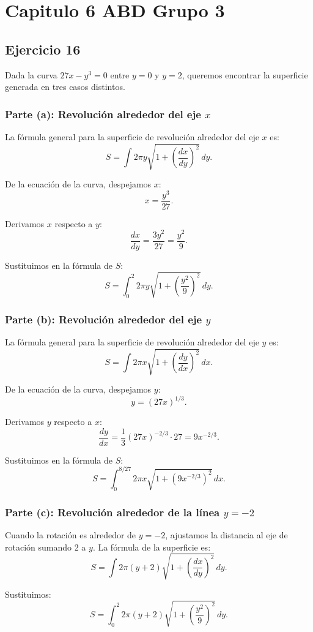 \chapter*{Capitulo 6 ABD Grupo 3}
\section*{Ejercicio 16}

Dada la curva \( 27x - y^3 = 0 \) entre \( y = 0 \) y \( y = 2 \), queremos encontrar la superficie generada en tres casos distintos.

\subsection*{Parte (a): Revolución alrededor del eje \( x \)}

La fórmula general para la superficie de revolución alrededor del eje \( x \) es:
\[
S = \int 2\pi y \sqrt{1 + \left( \frac{dx}{dy} \right)^2} \, dy.
\]

De la ecuación de la curva, despejamos \( x \):
\[
x = \frac{y^3}{27}.
\]

Derivamos \( x \) respecto a \( y \):
\[
\frac{dx}{dy} = \frac{3y^2}{27} = \frac{y^2}{9}.
\]

Sustituimos en la fórmula de \( S \):
\[
S = \int_{0}^{2} 2\pi y \sqrt{1 + \left( \frac{y^2}{9} \right)^2} \, dy.
\]

\subsection*{Parte (b): Revolución alrededor del eje \( y \)}

La fórmula general para la superficie de revolución alrededor del eje \( y \) es:
\[
S = \int 2\pi x \sqrt{1 + \left( \frac{dy}{dx} \right)^2} \, dx.
\]

De la ecuación de la curva, despejamos \( y \):
\[
y = (27x)^{1/3}.
\]

Derivamos \( y \) respecto a \( x \):
\[
\frac{dy}{dx} = \frac{1}{3} (27x)^{-2/3} \cdot 27 = 9x^{-2/3}.
\]

Sustituimos en la fórmula de \( S \):
\[
S = \int_{0}^{8/27} 2\pi x \sqrt{1 + \left( 9x^{-2/3} \right)^2} \, dx.
\]

\subsection*{Parte (c): Revolución alrededor de la línea \( y = -2 \)}

Cuando la rotación es alrededor de \( y = -2 \), ajustamos la distancia al eje de rotación sumando 2 a \( y \). La fórmula de la superficie es:
\[
S = \int 2\pi (y + 2) \sqrt{1 + \left( \frac{dx}{dy} \right)^2} \, dy.
\]

Sustituimos:
\[
S = \int_{0}^{2} 2\pi (y + 2) \sqrt{1 + \left( \frac{y^2}{9} \right)^2} \, dy.
\]
